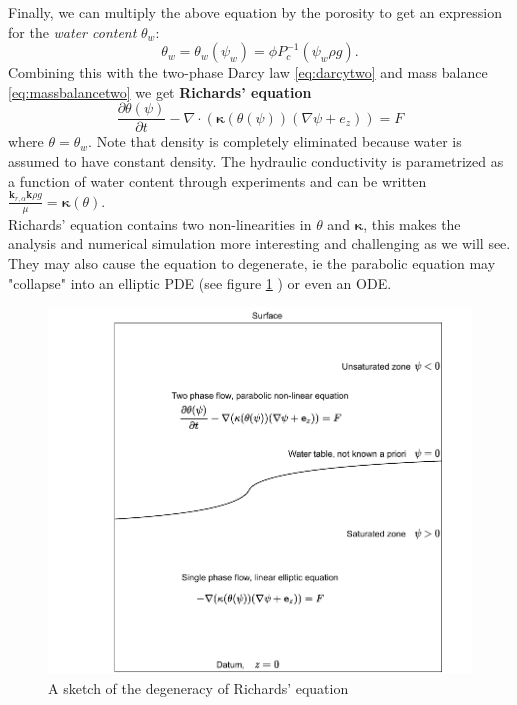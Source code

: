 \documentclass[../Main/main.tex]{subfiles}
\begin{document}
Finally, we can multiply the above equation by the porosity to get an expression for the \emph{water content} $\theta_w$:
\begin{equation*}
	\theta_w = \theta_w(\psi_w) = \phi P_c^{-1}(\psi_w\rho g).
\end{equation*}  
Combining this with the two-phase Darcy law \eqref{eq:darcytwo} and mass balance \eqref{eq:massbalancetwo} we get \textbf{Richards' equation}
\begin{equation}\label{eq:richards}
	\frac{\partial \theta(\psi)}{\partial t} - \nabla \cdot (\bm{\kappa} (\theta (\psi))(\nabla \psi + e_z)) = F
\end{equation}
where $\theta = \theta_w$. Note that density is completely eliminated because water is assumed to have constant density. The hydraulic conductivity is parametrized as a function of water content through experiments and can be written  $\frac{\bm{k}_{r,\alpha}\bm{k}\rho g}{\mu} = \bm{\kappa}(\theta)$. \\
Richards' equation contains two non-linearities in $\theta$ and $\bm{\kappa}$, this makes the analysis and numerical simulation more interesting and challenging as we will see. They may also cause the equation to degenerate, ie the parabolic equation may "collapse" into an elliptic PDE (see figure \ref{fig:richards} ) or even an ODE.
\begin{figure}[h]
	\centering
	\includegraphics[width=\textwidth]{Richards.pdf}
	\caption{A sketch of the degeneracy of Richards' equation}
	\label{fig:richards}
\end{figure}
 
\end{document}
